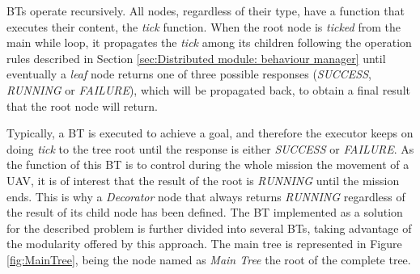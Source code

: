 \documentclass[fontsize=11pt, English=false, Español=true, Myfinal=true, twoside, numbers=noenddot]{scrbook}
\begin{document}
\glspl{BT} operate recursively. All nodes, regardless of their type, have a function that executes their content, the \emph{tick} function. When the root node is \emph{ticked} from the main while loop, it propagates the \emph{tick} among its children following the operation rules described in Section \ref{sec:Distributed module: behaviour manager} until eventually a \emph{leaf} node returns one of three possible responses (\emph{SUCCESS}, \emph{RUNNING} or \emph{FAILURE}), which will be propagated back, to obtain a final result that the root node will return. 

Typically, a \gls{BT} is executed to achieve a goal, and therefore the executor keeps on doing \emph{tick} to the tree root until the response is either \emph{SUCCESS} or \emph{FAILURE}. As the function of this \gls{BT} is to control during the whole mission the movement of a \gls{UAV}, it is of interest that the result of the root is \emph{RUNNING} until the mission ends. This is why a \emph{Decorator} node that always returns \emph{RUNNING} regardless of the result of its child node has been defined. The \gls{BT} implemented as a solution for the described problem is further divided into several \glspl{BT}, taking advantage of the modularity offered by this approach. The main tree is represented in Figure \ref{fig:MainTree}, being the node named as \emph{Main Tree} the root of the complete tree.
\end{document}
